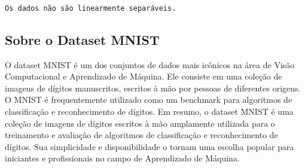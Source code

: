 \documentclass[11pt]{article}
\begin{document}
    \begin{center}
    \end{center}
    { \hspace*{\fill} \\}
    
    \begin{center}
    \end{center}
    { \hspace*{\fill} \\}
    
    \begin{center}
    \end{center}
    { \hspace*{\fill} \\}
    
    \begin{Verbatim}[commandchars=\\\{\}]
Os dados não são linearmente separáveis.
    \end{Verbatim}

    \hypertarget{sobre-o-dataset-mnist}{%
\subsection{Sobre o Dataset MNIST}\label{sobre-o-dataset-mnist}}

O dataset MNIST é um dos conjuntos de dados mais icônicos na área de
Visão Computacional e Aprendizado de Máquina. Ele consiste em uma
coleção de imagens de dígitos manuscritos, escritos à mão por pessoas de
diferentes origens. O MNIST é frequentemente utilizado como um benchmark
para algoritmos de classificação e reconhecimento de dígitos. Em resumo,
o dataset MNIST é uma coleção de imagens de dígitos escritos à mão
amplamente utilizada para o treinamento e avaliação de algoritmos de
classificação e reconhecimento de dígitos. Sua simplicidade e
disponibilidade o tornam uma escolha popular para iniciantes e
profissionais no campo de Aprendizado de Máquina.
\end{document}
